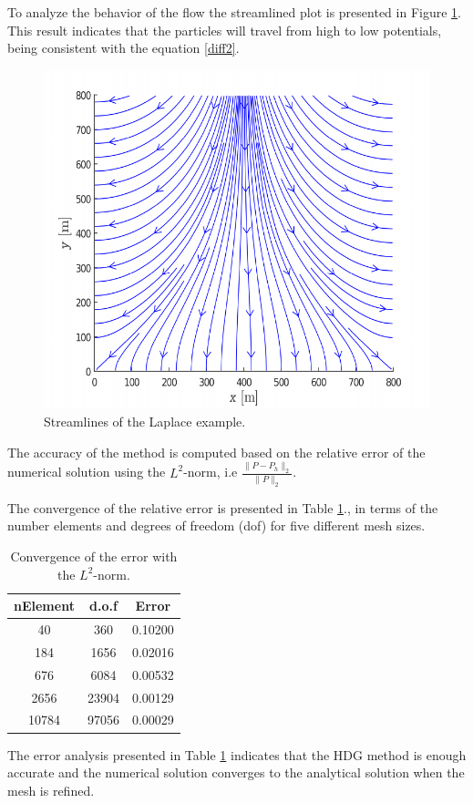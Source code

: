 \documentclass[review]{elsarticle}
\begin{document}
To analyze the behavior of the flow the streamlined plot is presented in Figure \ref{fig:soltexas1st}. 	This result indicates that the particles will travel from high to low potentials, being consistent with the equation \eqref{diff2}.

\begin{figure}[H]
	\centering
	\includegraphics[width=0.6\linewidth]{./Figures/Examples/Laplacian/soltexas1stream_rem}
	\caption[Test geometry 1]{Streamlines of the Laplace example.}
	\label{fig:soltexas1st}
\end{figure}

The accuracy of the method is computed based on the relative error of the numerical solution using the $L^2$-norm, i.e $\frac{\|P-P_h\|_2}{\|P\|_2}$.


The convergence of the relative error is presented in Table \ref{errorL2Texas1}., in terms of the number elements and degrees of freedom (dof) for five different mesh sizes. 

\begin{table}[H]
	\begin{center}
		\begin{tabular}{|c||c|c|}
			\hline
			nElement & d.o.f &  Error \\ \hline\hline
			40       &360    & 0.10200\\
			184      &1656   & 0.02016\\
			676      &6084   & 0.00532\\
			2656     &23904  & 0.00129\\
			10784    &97056  & 0.00029\\ \hline	
		\end{tabular}
		\caption{Convergence of the error with the $L^2$-norm.}\label{errorL2Texas1}
	\end{center}
\end{table}
The error analysis presented in Table \ref{errorL2Texas1} indicates that the HDG method is enough accurate and the numerical solution converges to the analytical solution when the mesh is refined.
\end{document}
